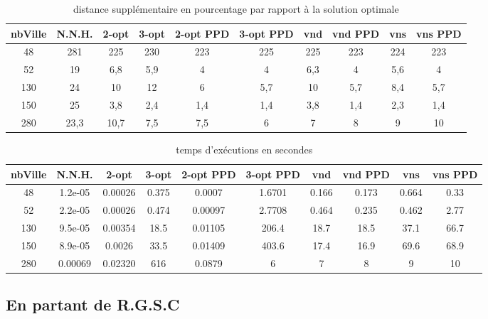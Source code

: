 \documentclass[12pt,a4paper]{article}
\begin{document}
\begin{table}[h]
\centering
\begin{tabular}{|*{10}{c|}}
  \hline
  nbVille & N.N.H. & 2-opt & 3-opt & 2-opt PPD & 3-opt PPD & vnd & vnd PPD & vns & vns PPD \\
  \hline
  48 & 281 & 225 & 230 & 223 & 225 & 225 & 223 & 224 & 223 \\
  52 & 19 & 6,8 & 5,9 & 4 & 4 & 6,3 & 4 & 5,6 & 4 \\
  130 & 24 & 10 & 12 & 6 & 5,7 & 10 & 5,7 & 8,4 & 5,7 \\
  150 & 25 & 3,8 & 2,4 & 1,4 & 1,4 & 3,8 & 1,4 & 2,3 & 1,4 \\
  280 & 23,3 & 10,7 & 7,5 & 7,5 & 6 & 7 & 8 & 9 & 10 \\
  \hline
\end{tabular}
\caption{distance supplémentaire en pourcentage par rapport à la solution optimale}
\label{NNHpourcentage}
\end{table}

\begin{table}[h]
\centering
\begin{tabular}{|*{10}{c|}}
  \hline
  nbVille & N.N.H. & 2-opt & 3-opt & 2-opt PPD & 3-opt PPD & vnd & vnd PPD & vns & vns PPD \\
  \hline
  48 & 1.2e-05 & 0.00026 & 0.375 & 0.0007 & 1.6701 & 0.166 & 0.173 & 0.664 & 0.33 \\
  52 & 2.2e-05 & 0.00026 & 0.474 & 0.00097 & 2.7708 & 0.464 & 0.235 & 0.462 & 2.77 \\
  130 & 9.5e-05 & 0.00354 & 18.5 & 0.01105 & 206.4 & 18.7 & 18.5 & 37.1 & 66.7 \\
  150 & 8.9e-05 & 0.0026 & 33.5 & 0.01409 & 403.6 & 17.4 & 16.9 & 69.6 & 68.9 \\
  280 & 0.00069 & 0.02320 & 616 & 0.0879 & 6 & 7 & 8 & 9 & 10 \\ 
  \hline
\end{tabular}
\caption{temps d’exécutions en secondes}
\label{NNHpourcentage}
\end{table}

\subsection{En partant de R.G.S.C}
\end{document}
